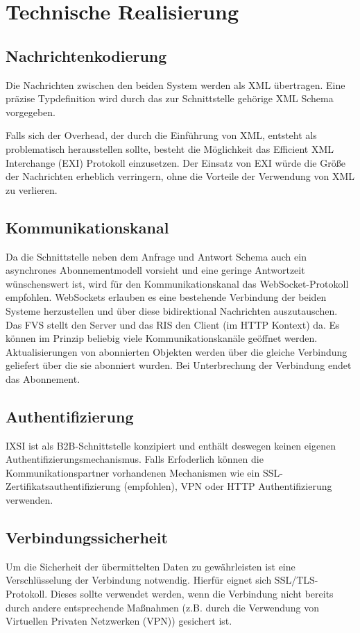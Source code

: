 \chapter{Technische Realisierung}
\label{sec:TechnischeRealisierung}


\section{Nachrichtenkodierung}
Die Nachrichten zwischen den beiden System werden als XML übertragen. Eine präzise Typdefinition wird durch das zur Schnittstelle gehörige XML Schema vorgegeben.

Falls sich der Overhead, der durch die Einführung von XML, entsteht als problematisch herausstellen sollte, besteht die Möglichkeit das Efficient XML Interchange (EXI) Protokoll einzusetzen. Der Einsatz von EXI würde die Größe der Nachrichten erheblich verringern, ohne die Vorteile der Verwendung von XML zu verlieren.

\section{Kommunikationskanal}
Da die Schnittstelle neben dem Anfrage und Antwort Schema auch ein asynchrones Abonnementmodell vorsieht und eine geringe Antwortzeit wünschenswert ist, wird für den Kommunikationskanal das WebSocket-Protokoll empfohlen. WebSockets erlauben es eine bestehende Verbindung der beiden Systeme herzustellen und über diese bidirektional Nachrichten auszutauschen. Das FVS stellt den Server und das RIS den Client (im HTTP Kontext) da. Es können im Prinzip beliebig viele Kommunikationskanäle geöffnet werden. Aktualisierungen von abonnierten Objekten werden über die gleiche Verbindung geliefert über die sie abonniert wurden. Bei Unterbrechung der Verbindung endet das Abonnement.

\section{Authentifizierung}
IXSI ist als B2B-Schnittstelle konzipiert und enthält deswegen keinen eigenen Authentifizierungsmechanismus. Falls Erfoderlich können die Kommunikationspartner vorhandenen Mechanismen wie ein SSL-Zertifikatsauthentifizierung (empfohlen), VPN oder HTTP Authentifizierung verwenden.

\section{Verbindungssicherheit}
Um die Sicherheit der übermittelten Daten zu gewährleisten ist eine Verschlüsselung der Verbindung notwendig. Hierfür eignet sich SSL/TLS-Protokoll. Dieses sollte verwendet werden, wenn die Verbindung nicht bereits durch andere entsprechende Maßnahmen (z.B. durch die Verwendung von Virtuellen Privaten Netzwerken (VPN)) gesichert ist.